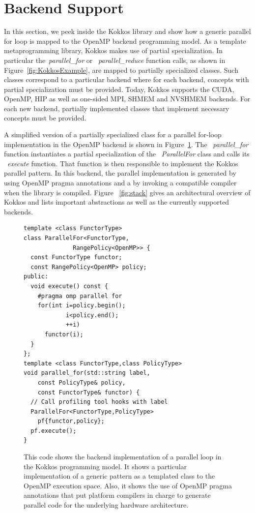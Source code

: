 
\section{Backend Support}\label{chap:backend}

In this section, we peek inside the Kokkos library and show how a generic parallel for loop is mapped to the OpenMP backend programming model. As a template metaprogramming library, Kokkos makes use of partial specialization. In particular the~\emph{parallel\_for} or ~\emph{parallel\_reduce} function calls, as shown in Figure~\ref{fig:KokkosExample}, are mapped to partially specialized classes. Such classes correspond to a particular backend where for each backend, concepts with partial specialization must be provided. Today, Kokkos supports the CUDA, OpenMP, HIP as well as one-sided MPI, SHMEM and NVSHMEM backends. For each new backend, partially implemented classes that implement necessary concepts must be provided.

A simplified version of a partially specialized class for a parallel for-loop implementation in the OpenMP backend is shown in Figure~\ref{fig:KokkosExampleOMPBackEnd}. The ~\emph{parallel\_for} function instantiates a partial specialization of the ~\emph{ParallelFor} class and calls its ~\emph{execute} function. That function is then responsible to implement the Kokkos parallel pattern. In this backend, the parallel implementation is generated by using OpenMP pragma annotations and a by invoking a compatible compiler when the library is compiled. Figure ~\ref{fig:stack} gives an architectural overview of Kokkos and lists important abstractions as well as the currently supported backends.
\begin{figure}
\begin{small}
\begin{verbatim}
template <class FunctorType>
class ParallelFor<FunctorType,
              RangePolicy<OpenMP>> {
  const FunctorType functor;
  const RangePolicy<OpenMP> policy; 
public:
  void execute() const {
    #pragma omp parallel for
    for(int i=policy.begin();
            i<policy.end();
            ++i)
      functor(i);
  }
};
template <class FunctorType,class PolicyType>
void parallel_for(std::string label, 
    const PolicyType& policy,
    const FunctorType& functor) {
  // Call profiling tool hooks with label
  ParallelFor<FunctorType,PolicyType> 
    pf{functor,policy};
  pf.execute();
}
\end{verbatim}
\end{small}
\caption{This code shows the backend implementation of a parallel loop in the Kokkos programming model. It shows a particular implementation of a generic pattern as a templated class to the OpenMP execution space. Also, it shows the use of OpenMP pragma annotations that put platform compilers in charge to generate parallel code for the underlying hardware architecture.}
\label{fig:KokkosExampleOMPBackEnd}
\end{figure}

